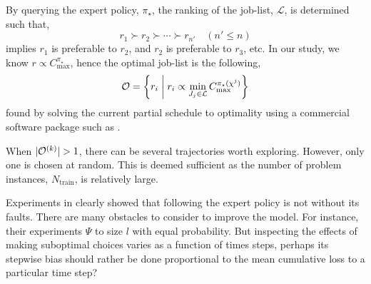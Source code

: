 By querying the expert policy, $\pi_\star$, the ranking of the job-list, 
$\mathcal{L}$, is determined such that,
\begin{equation}
r_1 \succ r_2 \succ \cdots \succ r_{n'} \quad (n' \leq n)
\end{equation}
implies $r_1$  is preferable to $r_2$, and $r_2$ is preferable to $r_3$, etc. 
In  our study, we know $r \propto C_{\max}^{\pi_\star}$, hence the optimal 
job-list is the following, 
\begin{equation}
\mathcal{O}=\left\{r_i\;\middle|\;r_i \propto \min_{J_j \in \mathcal{L}} 
    C_{\max}^{\pi_\star({\mathbf{\chi}}^j)}\right\}
\end{equation}
found by solving the current partial schedule to optimality using a 
commercial software package such as \cite{gurobi}. 

When $\lvert\mathcal{O}^{(k)}\rvert>1$, there can be several trajectories worth 
exploring. However, only one is chosen at random. This is deemed sufficient as 
the number of problem instances, $N_{\text{train}}$, is relatively large.

Experiments in \cite{InRu15b} clearly showed that following the expert policy 
is not without its faults. There are many obstacles to consider to improve the 
model. For instance, their experiments $\Psi$ to size $l$ with equal 
probability. But inspecting the effects of making suboptimal choices varies as 
a function of times steps, perhaps its stepwise bias should rather be done 
proportional to the mean cumulative loss to a particular time step?

